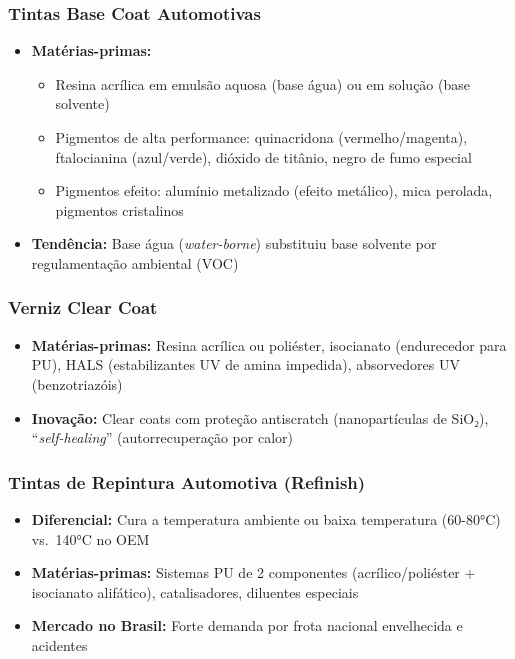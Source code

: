 \documentclass[
  12pt,
  a4paper,
  oneside,
  brazil,
  chapter=TITLE
]{article}
\begin{document}
\subsubsection{Tintas Base Coat
Automotivas}\label{tintas-base-coat-automotivas}

\begin{itemize}
\tightlist
\item
  \textbf{Matérias-primas:}

  \begin{itemize}
  \tightlist
  \item
    Resina acrílica em emulsão aquosa (base água) ou em solução (base
    solvente)
  \item
    Pigmentos de alta performance: quinacridona (vermelho/magenta),
    ftalocianina (azul/verde), dióxido de titânio, negro de fumo
    especial
  \item
    Pigmentos efeito: alumínio metalizado (efeito metálico), mica
    perolada, pigmentos cristalinos
  \end{itemize}
\item
  \textbf{Tendência:} Base água (\emph{water-borne}) substituiu base
  solvente por regulamentação ambiental (VOC)
\end{itemize}

\subsubsection{Verniz Clear Coat}\label{verniz-clear-coat}

\begin{itemize}
\tightlist
\item
  \textbf{Matérias-primas:} Resina acrílica ou poliéster, isocianato
  (endurecedor para PU), HALS (estabilizantes UV de amina impedida),
  absorvedores UV (benzotriazóis)
\item
  \textbf{Inovação:} Clear coats com proteção antiscratch
  (nanopartículas de SiO₂), ``\emph{self-healing}'' (autorrecuperação
  por calor)
\end{itemize}

\subsubsection{Tintas de Repintura Automotiva
(Refinish)}\label{tintas-de-repintura-automotiva-refinish}

\begin{itemize}
\tightlist
\item
  \textbf{Diferencial:} Cura a temperatura ambiente ou baixa temperatura
  (60-80°C) vs.~140°C no OEM
\item
  \textbf{Matérias-primas:} Sistemas PU de 2 componentes
  (acrílico/poliéster + isocianato alifático), catalisadores, diluentes
  especiais
\item
  \textbf{Mercado no Brasil:} Forte demanda por frota nacional
  envelhecida e acidentes
\end{itemize}
\end{document}
